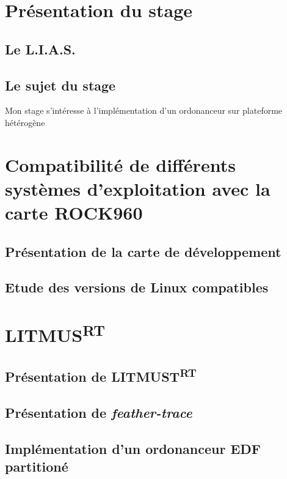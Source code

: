 \documentclass{article}
\begin{document}
    
    \section*{Présentation du stage}
    \subsection{Le L.I.A.S.}
    \subsection{Le sujet du stage}
    
    Mon stage s'intéresse à l'implémentation d'un ordonanceur sur plateforme hétérogène\cite{bertout2020workload}
    
    
    \section{Compatibilité de différents systèmes d'exploitation avec la carte ROCK960}
    \subsection{Présentation de la carte de développement}
    \subsection{Etude des versions de Linux compatibles}
    
    
    
    \section{LITMUS\textsuperscript{RT}}
    
    \subsection{Présentation de LITMUST\textsuperscript{RT}}
    
    \subsection{Présentation de \textit{feather-trace}}
    
    \subsection{Implémentation d'un ordonanceur EDF partitioné}
    
    
    \newpage
    
    
    \newpage
    \listoffigures
    
    \printnoidxglossaries
    
\end{document}
